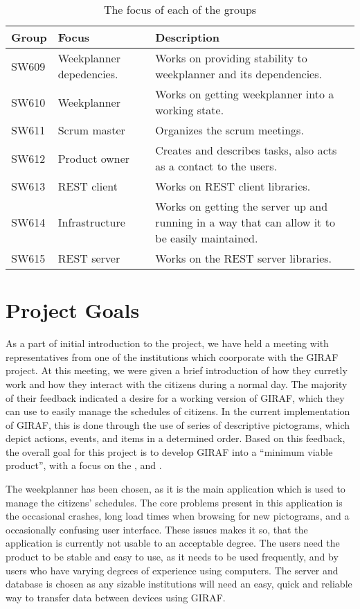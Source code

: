 \begin{table}[H]
\centering
\begin{tabular}{|p{2cm}|p{3cm}|p{8cm}|}
\hline
Group & Focus & Description \\ \hline
SW609 & Weekplanner depedencies. & Works on providing stability to
weekplanner and its dependencies.\\\hline 
SW610 & Weekplanner & Works on getting weekplanner into a working
state.\\\hline 
SW611 & Scrum master & Organizes the scrum meetings. \\\hline 
SW612 & Product owner & Creates and describes tasks, also acts as a contact to
the users. \\\hline 
SW613 & REST client & Works on REST client libraries.\\ \hline

SW614 & Infrastructure & Works on getting the server up and running in a way
that can allow it to be easily maintained. \\\hline

SW615 & REST server & Works on the REST server libraries.\\ \hline

\end{tabular}
\caption{The focus of each of the groups}
\label{GroupDivision}
\end{table}

\section{Project Goals}
As a part of initial introduction to the project, we have held a meeting with
representatives from one of the institutions which coorporate with the GIRAF
project. At this meeting, we were given a brief introduction of how they
curretly work and how they interact with the citizens during a normal day. The
majority of their feedback indicated a desire for a working version of GIRAF,
which they can use to easily manage the schedules of citizens. In the
current implementation of GIRAF, this is done through the use of series of
descriptive pictograms, which depict actions, events, and items in a determined
order. Based on this feedback, the overall goal for this project is to develop
GIRAF into a ``minimum viable product'', with a focus on the
,  and .\nl

The weekplanner has been chosen, as it is the main application which is used
to manage the citizens' schedules. The core problems present in this application is
the occasional crashes, long load times when browsing for new pictograms, and a
occasionally confusing user interface. These issues makes it so, that the
application is currently not usable to an acceptable degree. The users need the
product to be stable and easy to use, as it needs to be used frequently, and by
users who have varying degrees of experience using computers. The server
and database is chosen as any sizable institutions will need an easy, quick and
reliable way to transfer data between devices using GIRAF.\nl

